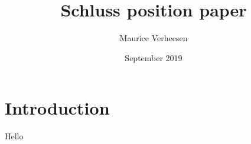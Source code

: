 \documentclass{article}
\title{Schluss position paper}
\author{Maurice Verheesen}
\date{September 2019}
\begin{document}
\maketitle

\section{Introduction}
Hello
\end{document}

